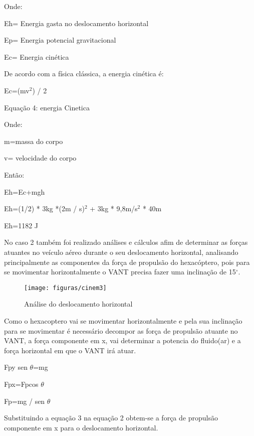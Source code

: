 Onde:

Eh= Energia gasta no deslocamento horizontal

Ep= Energia potencial gravitacional

Ec= Energia cinética

De acordo com a física clássica, a energia cinética é:

\begin{center}
Ec=(mv$^{2}$) / 2

Equação 4: energia Cinetica \cite{halliday1976}
\end{center}

Onde:

m=massa do corpo

v= velocidade do corpo

Então:

\begin{center}
Eh=Ec+mgh

Eh=(1/2) * 3kg *(2m / s)$^{2}$ + 3kg * 9,8m/s$^{2}$ * 40m

Eh=1182 J
\end{center}

No caso 2 também foi realizado análises e cálculos afim de determinar as forças atuantes no veículo aéreo durante o seu deslocamento horizontal, analisando principalmente as componentes da força de propulsão do hexacóptero, pois para se movimentar horizontalmente o VANT precisa fazer uma inclinação de 15$^{\circ}$.\cite{propulsao2011}

\begin{figure}[H]
\centering\texttt{[image: figuras/cinem3]}
\caption{Análise do deslocamento horizontal}
\end{figure}

Como o hexacoptero vai se movimentar horizontalmente e pela sua inclinação para se movimentar é necessário decompor as força de propulsão atuante no VANT, a força componente em x, vai determinar a potencia do fluido(ar) e a força horizontal em que o VANT irá atuar.\cite{propulsao2011}

\begin{center}
Fpy sen $\theta$=mg   \cite{halliday1976}

Fpx=Fpcos $\theta$   \cite{berkley1973}

Fp=mg / sen $\theta$  \cite{circuitostf2008}
\end{center}

Substituindo a equação 3 na equação 2 obtem-se a força de propulsão componente em x para o deslocamento horizontal.

